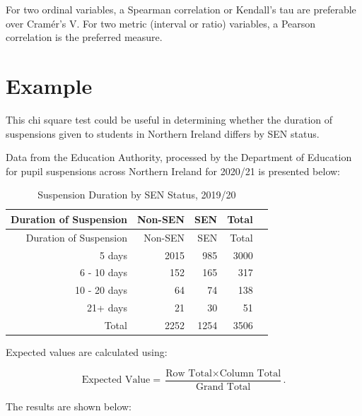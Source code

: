 \documentclass[
]{book}
\begin{document}
For two ordinal variables, a Spearman correlation or Kendall's tau are preferable over Cramér's V. For two metric (interval or ratio) variables, a Pearson correlation is the preferred measure.

\hypertarget{example-14}{%
\section{Example}\label{example-14}}

This chi square test could be useful in determining whether the duration of suspensions given to students in Northern Ireland differs by SEN status.

Data from the Education Authority, processed by the Department of Education for pupil suspensions across Northern Ireland for 2020/21 is presented below:

\begin{longtable}[]{@{}rrrrr@{}}
\caption{\label{tab:table18} Suspension Duration by SEN Status, 2019/20}\tabularnewline
\toprule
Duration of Suspension & Non-SEN & SEN & Total & \\
\midrule
\endfirsthead
\toprule
Duration of Suspension & Non-SEN & SEN & Total & \\
\midrule
\endhead
5 days & 2015 & 985 & 3000 & \\
6 - 10 days & 152 & 165 & 317 & \\
10 - 20 days & 64 & 74 & 138 & \\
21+ days & 21 & 30 & 51 & \\
Total & 2252 & 1254 & 3506 & \\
\bottomrule
\end{longtable}

Expected values are calculated using:

\[\textrm{Expected Value}= \frac{\textrm{Row Total} \times \textrm{Column Total}}{\textrm{Grand Total}}.\]

The results are shown below:
\end{document}
